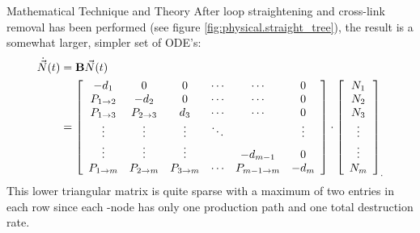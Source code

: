 \begin{chapter}{Mathematical Technique and Theory\label{chap:math}}
  After loop straightening and cross-link removal has been performed
  (see figure \ref{fig:physical.straight_tree}), the result is a
  somewhat larger, simpler set of ODE's:
  \begin{equation}
    \begin{split}
      \dot{\vec{N}}(t) &= \mbox{$\mathbf{B}$}\vec{N}(t)\\
        &= \left [
          \begin{array}{cccccc}
            -d_1 & 0 & 0 & \cdots & \cdots & 0 \\
            P_{1\rightarrow 2} & -d_2 & 0 & \cdots & \cdots & 0\\
            P_{1\rightarrow 3} & P_{2\rightarrow 3} & d_3 & \cdots & \cdots & 0 \\
            \vdots & \vdots & \vdots & \ddots &  & \vdots\\
            \vdots & \vdots & \vdots & & -d_{m-1} & 0\\
            P_{1\rightarrow m} & P_{2\rightarrow m} & P_{3\rightarrow m} & \cdots & P_{m-1\rightarrow m} & -d_m
          \end{array} \right ] \cdot \left [
          \begin{array}{c}
            N_1 \\ N_2 \\ N_3 \\ \vdots \\ \vdots \\ N_m
          \end{array} \right ]_.\label{eq:math.intro.tree}
    \end{split}
  \end{equation}
  This lower triangular matrix is quite sparse with a maximum of two
  entries in each row since each \pc-node has only one production path
  and one total destruction rate.
  

\end{chapter}
